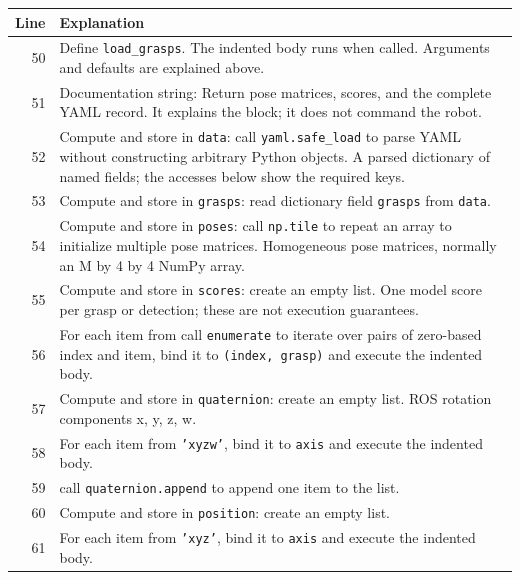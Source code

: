 \documentclass[11pt,a4paper]{book}
\begin{document}
\begin{longtable}{r p{}}

\textbf{Line} & \textbf{Explanation} \\ \hline \endhead

50 & Define \texttt{load\_grasps}. The indented body runs when called. Arguments and defaults are explained above. \\

51 & Documentation string: Return pose matrices, scores, and the complete YAML record. It explains the block; it does not command the robot. \\

52 & Compute and store in \texttt{data}: call \texttt{yaml.safe\_load} to parse YAML without constructing arbitrary Python objects. A parsed dictionary of named fields; the accesses below show the required keys. \\

53 & Compute and store in \texttt{grasps}: read dictionary field \texttt{grasps} from \texttt{data}.  \\

54 & Compute and store in \texttt{poses}: call \texttt{np.tile} to repeat an array to initialize multiple pose matrices. Homogeneous pose matrices, normally an M by 4 by 4 NumPy array. \\

55 & Compute and store in \texttt{scores}: create an empty list. One model score per grasp or detection; these are not execution guarantees. \\

56 & For each item from call \texttt{enumerate} to iterate over pairs of zero-based index and item, bind it to \texttt{(index, grasp)} and execute the indented body. \\

57 & Compute and store in \texttt{quaternion}: create an empty list. ROS rotation components x, y, z, w. \\

58 & For each item from \texttt{'xyzw'}, bind it to \texttt{axis} and execute the indented body. \\

59 & call \texttt{quaternion.append} to append one item to the list. \\

60 & Compute and store in \texttt{position}: create an empty list.  \\

61 & For each item from \texttt{'xyz'}, bind it to \texttt{axis} and execute the indented body. \\


\end{longtable}
\end{document}

